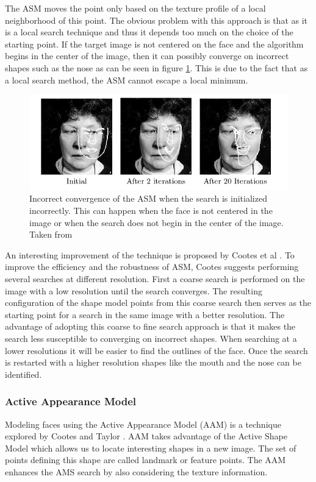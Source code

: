 \documentclass[11pt,a4paper]{report}
\begin{document}
The ASM moves the point only based on the texture profile of a
local neighborhood of this point. The obvious problem with this approach is
that as it is a local search technique and thus it depends too much on the choice of the
starting point. If the target image is not centered on the face and the
algorithm begins in the center of the image, then it can possibly converge on incorrect
shapes such as the nose as can be seen in figure \ref{gr:bad_asm}. This is due to
the fact that as a local search method, the ASM cannot escape a local minimum.

\begin{figure}[H]
\centering
\includegraphics[scale=0.7]{images/bad_asm.png}
\caption{ Incorrect convergence of the ASM when the search is initialized
  incorrectly. This can happen when the face is not centered in the image or
  when the search does not begin in the center of the image. Taken from \cite{cootesOverview01} }
\label{gr:bad_asm}
\end{figure}

An interesting improvement of the technique is proposed by Cootes et al
\cite{activeApp04}. To improve the efficiency and the robustness of ASM, Cootes
suggests performing several searches at different resolution. First a coarse
search is performed on the image with a low resolution until the search converges. The resulting configuration
of the shape model points from this coarse search
then serves as the starting point for a search in the same image with a better
resolution. The advantage of adopting this coarse to fine search approach is
that it makes the search less susceptible to converging on incorrect shapes. When
searching at a lower resolutions it will be easier to find the outlines of the
face. Once the search is restarted with a higher resolution shapes like the
mouth and the nose can be identified.

\subsubsection{Active Appearance Model}
Modeling faces using the Active Appearance Model (AAM) is a technique explored
by Cootes and Taylor \cite{activeApp04}. AAM takes advantage of the
Active Shape Model which allows us to locate interesting shapes in a new
image. The set of points defining this shape are called landmark or feature
points. The AAM enhances the AMS search by also considering the texture
information.
\end{document}
